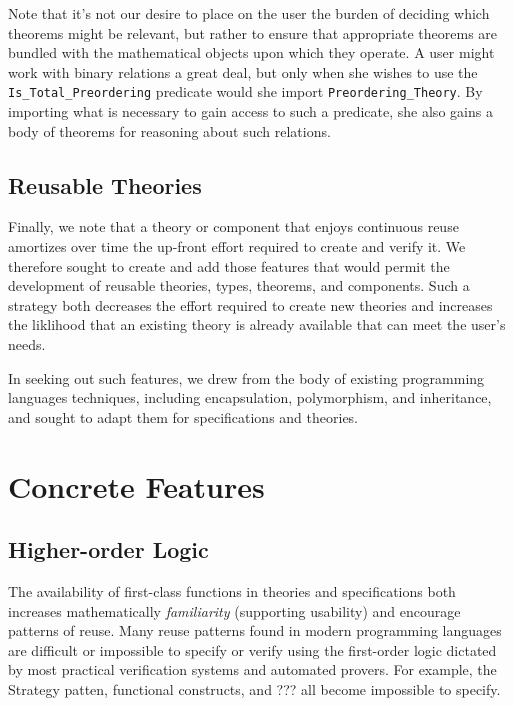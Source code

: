 Note that it's not our desire to place on the user the burden of deciding which theorems might be relevant, but rather to ensure that appropriate theorems are bundled with the mathematical objects upon which they operate.  A user might work with binary relations a great deal, but only when she wishes to use the \texttt{Is\_Total\_Preordering} predicate would she import \texttt{Preordering\_Theory}.  By importing what is necessary to gain access to such a predicate, she also gains a body of theorems for reasoning about such relations.

	\subsection{Reusable Theories\label{reusableTheories}}

Finally, we note that a theory or component that enjoys continuous reuse amortizes over time the up-front effort required to create and verify it.  We therefore sought to create and add those features that would permit the development of reusable theories, types, theorems, and components.  Such a strategy both decreases the effort required to create new theories and increases the liklihood that an existing theory is already available that can meet the user's needs.

In seeking out such features, we drew from the body of existing programming languages techniques, including encapsulation, polymorphism, and inheritance, and sought to adapt them for specifications and theories.

\section{Concrete Features\label{mathFeatures}}

	\subsection{Higher-order Logic\label{higherOrderLogic}}

The availability of first-class functions in theories and specifications both increases mathematically \emph{familiarity} (supporting usability) and encourage patterns of reuse.  Many reuse patterns found in modern programming languages are difficult or impossible to specify or verify using the first-order logic dictated by most practical verification systems and automated provers.  For example, the Strategy patten, functional constructs, and ??? all become impossible to specify.

